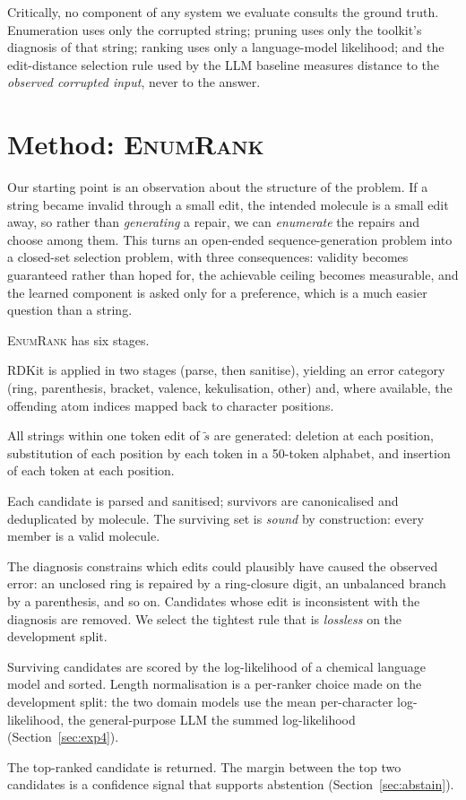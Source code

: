 \documentclass[11pt]{article}
\newcommand{\ours}{\textsc{EnumRank}}
\begin{document}
Critically, no component of any system we evaluate consults the ground truth.
Enumeration uses only the corrupted string; pruning uses only the toolkit's
diagnosis of that string; ranking uses only a language-model likelihood; and the
edit-distance selection rule used by the LLM baseline measures distance to the
\emph{observed corrupted input}, never to the answer.

\section{Method: \ours{}}\label{sec:method}

Our starting point is an observation about the structure of the problem. If a
string became invalid through a small edit, the intended molecule is a small
edit away, so rather than \emph{generating} a repair, we can \emph{enumerate}
the repairs and choose among them. This turns an open-ended sequence-generation
problem into a closed-set selection problem, with three consequences: validity
becomes guaranteed rather than hoped for, the achievable ceiling becomes
measurable, and the learned component is asked only for a preference, which is a
much easier question than a string.

\ours{} has six stages.

\begin{description}\itemsep3pt
\item[1. Diagnose.] RDKit is applied in two stages (parse, then sanitise),
  yielding an error category (ring, parenthesis, bracket, valence,
  kekulisation, other) and, where available, the offending atom indices mapped
  back to character positions.
\item[2. Enumerate.] All strings within one token edit of $\tilde{s}$ are
  generated: deletion at each position, substitution of each position by each
  token in a 50-token alphabet, and insertion of each token at each position.
\item[3. Verify.] Each candidate is parsed and sanitised; survivors are
  canonicalised and deduplicated by molecule. The surviving set is \emph{sound}
  by construction: every member is a valid molecule.
\item[4. Prune.] The diagnosis constrains which edits could plausibly have
  caused the observed error: an unclosed ring is repaired by a ring-closure
  digit, an unbalanced branch by a parenthesis, and so on. Candidates whose edit
  is inconsistent with the diagnosis are removed. We select the tightest rule
  that is \emph{lossless} on the development split.
\item[5. Rank.] Surviving candidates are scored by the log-likelihood of a
  chemical language model and sorted. Length normalisation is a per-ranker
  choice made on the development split: the two domain models use the mean
  per-character log-likelihood, the general-purpose LLM the summed
  log-likelihood (Section~\ref{sec:exp4}).
\item[6. Recover or abstain.] The top-ranked candidate is returned. The margin
  between the top two candidates is a confidence signal that supports
  abstention (Section~\ref{sec:abstain}).
\end{description}
\end{document}
